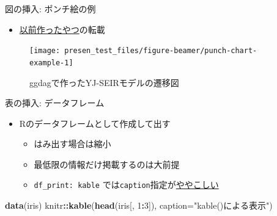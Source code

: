 \documentclass[14pt,ignorenonframetext,]{beamer}
\newenvironment{Shaded}{\begin{snugshade}}{\end{snugshade}}
\newcommand{\DataTypeTok}[1]{\textcolor[rgb]{0.13,0.29,0.53}{#1}}
\newcommand{\DecValTok}[1]{\textcolor[rgb]{0.00,0.00,0.81}{#1}}
\newcommand{\KeywordTok}[1]{\textcolor[rgb]{0.13,0.29,0.53}{\textbf{#1}}}
\newcommand{\NormalTok}[1]{#1}
\newcommand{\OperatorTok}[1]{\textcolor[rgb]{0.81,0.36,0.00}{\textbf{#1}}}
\newcommand{\StringTok}[1]{\textcolor[rgb]{0.31,0.60,0.02}{#1}}
\providecommand{\tightlist}{%
  \setlength{\itemsep}{0pt}\setlength{\parskip}{0pt}}
\begin{document}
\begin{frame}{図の挿入: ポンチ絵の例}
\protect\hypertarget{ux56f3ux306eux633fux5165-ux30ddux30f3ux30c1ux7d75ux306eux4f8b}{}

\begin{itemize}
\tightlist
\item
  \href{https://speakerdeck.com/ktgrstsh/r-and-epidemical-mathematical-models}{以前作ったやつ}の転載
\end{itemize}

\begin{figure}

{\centering \texttt{[image: presen\_test\_files/figure-beamer/punch-chart-example-1]} 

}

\caption{ggdagで作ったYJ-SEIRモデルの遷移図}\label{fig:punch-chart-example}
\end{figure}

\end{frame}

\begin{frame}[fragile]{表の挿入: データフレーム}
\protect\hypertarget{ux8868ux306eux633fux5165-ux30c7ux30fcux30bfux30d5ux30ecux30fcux30e0}{}

\begin{itemize}
\tightlist
\item
  Rのデータフレームとして作成して出す

  \begin{itemize}
  \tightlist
  \item
    はみ出す場合は縮小
  \item
    最低限の情報だけ掲載するのは大前提
  \item
    \texttt{df\_print:\ kable}
    では\texttt{caption}指定が\href{https://stackoverflow.com/questions/48410861/how-to-add-table-caption-using-df-print}{ややこしい}
  \end{itemize}
\end{itemize}

\begin{Shaded}
\begin{Highlighting}[]
\KeywordTok{data}\NormalTok{(iris)}
\NormalTok{knitr}\OperatorTok{::}\KeywordTok{kable}\NormalTok{(}\KeywordTok{head}\NormalTok{(iris[, }\DecValTok{1}\OperatorTok{:}\DecValTok{3}\NormalTok{]),}
             \DataTypeTok{caption=}\StringTok{"kable()による表示"}\NormalTok{)}
\end{Highlighting}
\end{Shaded}

\end{frame}
\end{document}
